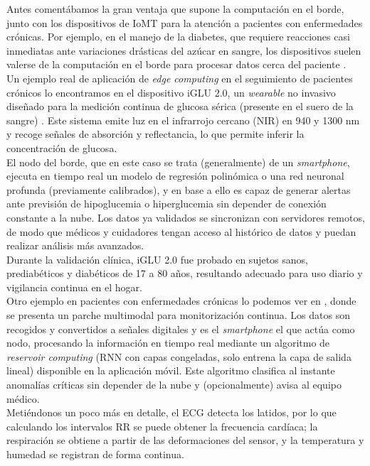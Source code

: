 \documentclass[twoside, 12pt]{opticajnl}
\begin{document}
Antes comentábamos la gran ventaja que supone la computación en el borde, junto con los dispositivos de IoMT para la atención a pacientes con enfermedades crónicas. Por ejemplo, en el manejo de la diabetes, que requiere reacciones casi inmediatas ante variaciones drásticas del azúcar en sangre, los dispositivos suelen valerse de la computación en el borde para procesar datos cerca del paciente . \\

Un ejemplo real de aplicación de \textit{edge computing} en el seguimiento de pacientes crónicos lo encontramos en el dispositivo iGLU 2.0, un \textit{wearable} no invasivo diseñado para la medición continua de glucosa sérica (presente en el suero de la sangre) . Este sistema emite luz en el infrarrojo cercano (NIR) en 940 y 1300 nm y recoge señales de absorción y reflectancia, lo que permite inferir la concentración de glucosa. \\

El nodo del borde, que en este caso se trata (generalmente) de un \textit{smartphone}, ejecuta en tiempo real un modelo de regresión polinómica o una red neuronal profunda (previamente calibrados), y en base a ello es capaz de generar alertas ante previsión de hipoglucemia o hiperglucemia sin depender de conexión constante a la nube. Los datos ya validados se sincronizan con servidores remotos, de modo que médicos y cuidadores tengan acceso al histórico de datos y puedan realizar análisis más avanzados. \\

Durante la validación clínica, iGLU 2.0 fue probado en sujetos sanos, prediabéticos y diabéticos de 17 a 80 años, resultando adecuado para uso diario y vigilancia continua en el hogar. \\

Otro ejemplo en pacientes con enfermedades crónicas lo podemos ver en , donde se presenta un parche multimodal para monitorización continua. Los datos son recogidos y convertidos a señales digitales y es el \textit{smartphone} el que actúa como nodo, procesando la información en tiempo real mediante un algoritmo de \textit{reservoir computing} (RNN con capas congeladas, solo entrena la capa de salida lineal) disponible en la aplicación móvil. Este algoritmo clasifica al instante anomalías críticas sin depender de la nube y (opcionalmente) avisa al equipo médico. \\

Metiéndonos un poco más en detalle, el ECG detecta los latidos, por lo que calculando los intervalos RR se puede obtener la frecuencia cardíaca; la respiración se obtiene a partir de las deformaciones del sensor, y la temperatura y humedad se registran de forma continua. \\
\end{document}

